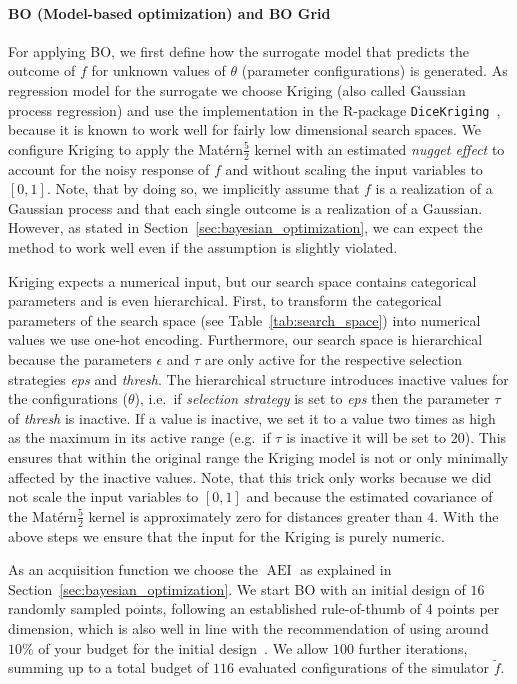 \documentclass[bimj,fleqn]{w-art}
\theoremstyle{plain}
\theoremstyle{definition}
\begin{document}
\paragraph{BO (Model-based optimization) and BO Grid}
For applying BO, we first define how the surrogate model that predicts the outcome of $f$ for unknown values of $\theta$ (parameter configurations) is generated.
As regression model for the surrogate we choose Kriging (also called Gaussian process regression) and use the implementation in the R-package \texttt{DiceKriging}~\citep{roustant_dicekriging_2012}, because it is known to work well for fairly low dimensional search spaces.
We configure Kriging to apply the Matérn$\frac{5}{2}$ kernel with an estimated \emph{nugget effect} to account for the noisy response of $f$ and without scaling the input variables to $[0,1]$.
Note, that by doing so, we implicitly assume that $f$ is a realization of a Gaussian process and that each single outcome is a realization of a Gaussian.
However, as stated in Section~\ref{sec:bayesian_optimization}, we can expect the method to work well even if the assumption is slightly violated.


Kriging expects a numerical input, but our search space contains categorical parameters and is even hierarchical.
First, to transform the categorical parameters of the search space (see Table~\ref{tab:search_space}) into numerical values we use one-hot encoding.
Furthermore, our search space is hierarchical because the parameters $\epsilon$ and $\tau$ are only active for the respective selection strategies \emph{eps} and \emph{thresh}.
The hierarchical structure introduces inactive values for the configurations ($\theta$), i.e.\ if \emph{selection strategy} is set to \emph{eps} then the parameter $\tau$ of \emph{thresh} is inactive.
If a value is inactive, we set it to a value two times as high as the maximum in its active range (e.g.\ if $\tau$ is inactive it will be set to 20).
This ensures that within the original range the Kriging model is not or only minimally affected by the inactive values.
Note, that this trick only works because we did not scale the input variables to $[0,1]$ and because the estimated covariance of the Matérn$\frac{5}{2}$ kernel is approximately zero for distances greater than $4$.
With the above steps we ensure that the input for the Kriging is purely numeric.

As an acquisition function we choose the $\operatorname{AEI}$ as explained in Section~\ref{sec:bayesian_optimization}.
We start BO with an initial design of $16$ randomly sampled points, following an established rule-of-thumb of $4$ points per dimension, which is also well in line with the recommendation of using around $10\%$ of your budget for the initial design~\cite{bossek_initial_2020}.
We allow $100$ further iterations, summing up to a total budget of $116$ evaluated configurations of the simulator $\tilde{f}$.
\end{document}
